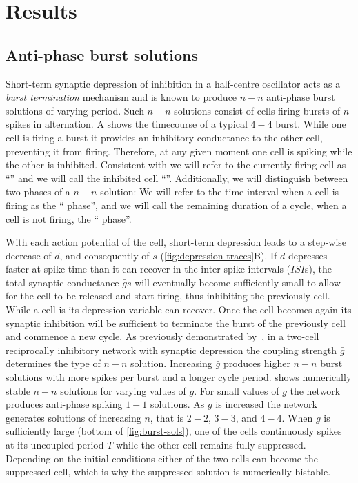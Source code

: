 \section{Results}
\subsection{Anti-phase burst solutions}
Short-term synaptic depression of inhibition in a half-centre oscillator acts as a \emph{burst termination} mechanism \citep{brown1911} and is known to produce \(n-n\) anti-phase burst solutions of varying period.
Such \(n-n\) solutions consist of cells firing bursts of \(n\) spikes in alternation.
A shows the timecourse of a typical \(4-4\) burst.
While one cell is firing a burst it provides an inhibitory conductance to the other cell,  preventing it from firing.
Therefore, at any given moment one cell is spiking while the other is inhibited. Consistent with \citet{bose2011} we will refer to the currently firing cell as ``\free{}'' and we will call the inhibited cell ``\quiet{}''.
Additionally, we will distinguish between two phases of a \(n-n\) solution:
We will refer to the time interval when a cell is firing as the ``\free{} phase'', and we will call the remaining duration of a cycle, when a cell is not firing, the ``\quiet{}  phase''.

With each action potential of the \free{} cell, short-term depression leads to a step-wise decrease of \(d\), and consequently of \(s\) (\cref{fig:depression-traces}B).
If \(d\) depresses faster at spike time than it can recover in the inter-spike-intervals (\(ISI\)s), the total synaptic conductance \(\bar g s\) will eventually become sufficiently small to allow for the \quiet{} cell to be released and start firing, thus inhibiting the previously \free{} cell.
While a cell is \quiet{} its depression variable can recover.
Once the \quiet{} cell becomes \free{} again its synaptic inhibition will be sufficient to terminate the burst of the previously \free{} cell and commence a new cycle.
As previously demonstrated by~\citet{bose2011}, in a two-cell reciprocally inhibitory network with synaptic depression the coupling strength \(\bar g\) determines the type of \(n-n\) solution.
Increasing \(\bar g\) produces higher \(n-n\) burst solutions with more spikes per burst and a longer cycle period.
 shows numerically stable \(n-n\) solutions for varying values of \(\bar g\).
For small values of \(\bar g\) the network produces anti-phase spiking \(1-1\) solutions.
As \(\bar g\) is increased the network generates solutions of increasing \(n\), that is \(2-2\), \(3-3\), and \(4-4\).
When \(\bar g\) is sufficiently large (bottom of \cref{fig:burst-sols}), one of the cells continuously spikes at its uncoupled period \(T\) while the other cell remains fully suppressed.
Depending on the initial conditions either of the two cells can become the suppressed cell, which is why the suppressed solution is numerically bistable.

